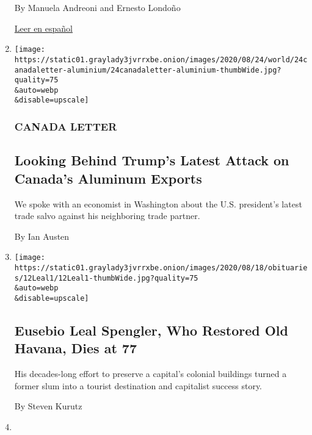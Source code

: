 \begin{enumerate}
  By Manuela Andreoni and Ernesto Londoño

  \href{https://www.nytimes3xbfgragh.onion/es/2020/08/17/espanol/america-latina/vacuna-coronavirus-brasil.html}{Leer
  en español}
\item
  \href{/2020/08/14/world/canada/trump-canada-aluminum-exports.html}{}

  \texttt{[image: https://static01.graylady3jvrrxbe.onion/images/2020/08/24/world/24canadaletter-aluminium/24canadaletter-aluminium-thumbWide.jpg?quality=75\\\&auto=webp\\\&disable=upscale]}

  \hypertarget{canada-letter}{%
  \subsubsection{CANADA LETTER}\label{canada-letter}}

  \hypertarget{looking-behind-trumps-latest-attack-on-canadas-aluminum-exports}{%
  \subsection{Looking Behind Trump's Latest Attack on Canada's Aluminum
  Exports}\label{looking-behind-trumps-latest-attack-on-canadas-aluminum-exports}}

  We spoke with an economist in Washington about the U.S. president's
  latest trade salvo against his neighboring trade partner.

  By Ian Austen
\item
  \href{/2020/08/14/world/americas/eusebio-leal-spengler-who-restored-old-havana-dies-at-77.html}{}

  \texttt{[image: https://static01.graylady3jvrrxbe.onion/images/2020/08/18/obituaries/12Leal1/12Leal1-thumbWide.jpg?quality=75\\\&auto=webp\\\&disable=upscale]}

  \hypertarget{eusebio-leal-spengler-who-restored-old-havana-dies-at-77}{%
  \subsection{Eusebio Leal Spengler, Who Restored Old Havana, Dies at
  77}\label{eusebio-leal-spengler-who-restored-old-havana-dies-at-77}}

  His decades-long effort to preserve a capital's colonial buildings
  turned a former slum into a tourist destination and capitalist success
  story.

  By Steven Kurutz
\item
  \href{/2020/08/14/arts/luchita-hurtado-dead.html}{}


\end{enumerate}
